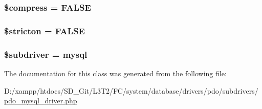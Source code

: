 \subsubsection[{\$compress}]{\setlength{\rightskip}{0pt plus 5cm}\$compress = F\+A\+L\+S\+E}\label{class_c_i___d_b__pdo__mysql__driver_abf799de0d30288b91ee73769281dd69d}
\hypertarget{class_c_i___d_b__pdo__mysql__driver_afb42d9811bec1da94506e5764e1439e0}{}
\subsubsection[{\$stricton}]{\setlength{\rightskip}{0pt plus 5cm}\$stricton = F\+A\+L\+S\+E}\label{class_c_i___d_b__pdo__mysql__driver_afb42d9811bec1da94506e5764e1439e0}
\hypertarget{class_c_i___d_b__pdo__mysql__driver_a1322ca756348b11d080cb7a4f590de15}{}
\subsubsection[{\$subdriver}]{\setlength{\rightskip}{0pt plus 5cm}\$subdriver = \textquotesingle{}mysql\textquotesingle{}}\label{class_c_i___d_b__pdo__mysql__driver_a1322ca756348b11d080cb7a4f590de15}


The documentation for this class was generated from the following file\+:\begin{DoxyCompactItemize}
\item 
D\+:/xampp/htdocs/\+S\+D\+\_\+\+Git/\+L3\+T2/\+F\+C/system/database/drivers/pdo/subdrivers/\hyperlink{pdo__mysql__driver_8php}{pdo\+\_\+mysql\+\_\+driver.\+php}\end{DoxyCompactItemize}
